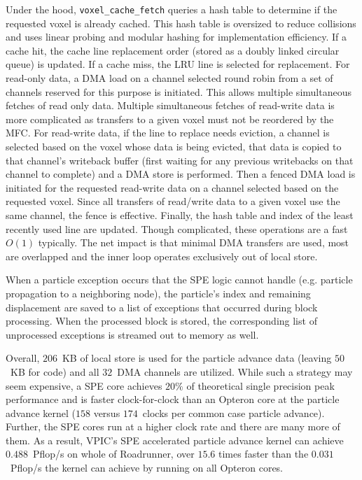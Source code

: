 \documentclass[journal,twoside]{IEEEtran}
\begin{document}
Under the hood, \verb+voxel_cache_fetch+ queries a hash table to
determine if the requested voxel is already cached.  This hash table
is oversized to reduce collisions and uses linear probing and modular
hashing for implementation efficiency.  If a cache hit, the cache line
replacement order (stored as a doubly linked circular queue) is
updated.  If a cache miss, the LRU line is selected for replacement.
For read-only data, a DMA load on a channel selected round robin from
a set of channels reserved for this purpose is initiated.  This allows
multiple simultaneous fetches of read only data.  Multiple
simultaneous fetches of read-write data is more complicated as
transfers to a given voxel must not be reordered by the MFC.  For
read-write data, if the line to replace needs eviction, a channel is
selected based on the voxel whose data is being evicted, that data is
copied to that channel's writeback buffer (first waiting for any
previous writebacks on that channel to complete) and a DMA store is
performed.  Then a fenced DMA load is initiated for the requested
read-write data on a channel selected based on the requested voxel.
Since all transfers of read/write data to a given voxel use the same
channel, the fence is effective.  Finally, the hash table and index of
the least recently used line are updated.  Though complicated, these
operations are a fast $O(1)$ typically.  The net impact is that
minimal DMA transfers are used, most are overlapped and the inner loop
operates exclusively out of local store.

When a particle exception occurs that the SPE logic cannot handle
(e.g. particle propagation to a neighboring node), the particle's
index and remaining displacement are saved to a list of exceptions
that occurred during block processing.  When the processed block is
stored, the corresponding list of unprocessed exceptions is streamed
out to memory as well.

Overall, $206$~KB of local store is used for the particle advance data
(leaving $50$~KB for code) and all $32$~DMA channels are utilized.
While such a strategy may seem expensive, a SPE core achieves $20\%$
of theoretical single precision peak performance and is faster
clock-for-clock than an Opteron core at the particle advance kernel
($158$ versus $174$~clocks per common case particle advance).
Further, the SPE cores run at a higher clock rate and there are many
more of them.  As a result, VPIC's SPE accelerated particle advance
kernel can achieve $0.488$~Pflop/s on whole of Roadrunner, over $15.6$
times faster than the $0.031$~Pflop/s the kernel can achieve by
running on all Opteron cores.
\end{document}
